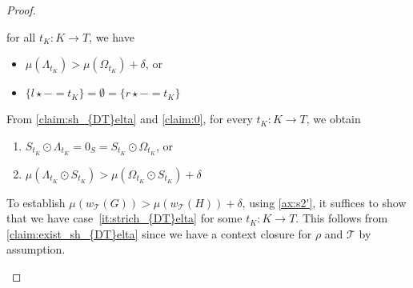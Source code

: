 \begin{proof}
\begin{enumerate}
            for all $t_K : K \to T$, we have  
                            \begin{itemize}                                
                                \item $\mu(\Lambda_{t_K}) > \mu(\Omega_{t_K}) + \delta$,
                                 or
                                \item $\{l \star - = t_K\} = \emptyset = \{r \star - = t_K\}$
                            \end{itemize}
            From \ref{claim:sh_{DT}elta} and \ref{claim:0}, for every \( t_K: K \rightarrow T \), we obtain
            \begin{enumerate}[label=(\roman*)]
                \item $S_{t_K} \odot \Lambda_{t_K} = 0_S =  S_{t_K} \odot \Omega_{t_K}$, or
                \item  \label{it:strich_{DT}elta}  $\mu(\Lambda_{t_K} \odot S_{t_K}) > \mu(\Omega_{t_K} \odot S_{t_K}) + \delta$
            \end{enumerate}
            To establish $ \mu(w_\mathcal{T}(G)) > \mu(w_\mathcal{T}(H)) + \delta$, using \eqref{ax:s2'}, 
            it suffices to show that we have case~\ref{it:strich_{DT}elta} for some $t_K : K \to T$.
            This follows from \ref{claim:exist_sh_{DT}elta} since we have a context closure for $\rho$ and $\mathcal{T}$ by assumption.

\end{enumerate}
\end{proof}
